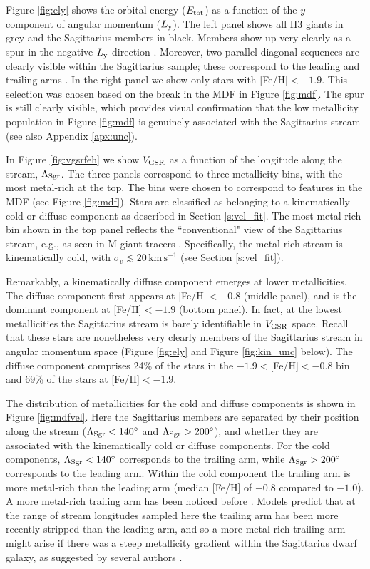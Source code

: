 \documentclass[twocolumn,tighten,twocolappendix]{aastex63}
\newcommand{\sgr}{Sagittarius}
\newcommand{\kms}{\mathrm{km} \, \mathrm{s}^{-1}}
\newcommand{\Ly}{L_{\rm y}}
\newcommand{\Vgsr}{V_{\rm GSR}}
\begin{document}
\begin{CJK*}{UTF8}{gbsn}
Figure \ref{fig:ely} shows the orbital energy ($E_{\rm tot}$) as a function of the $y-$component of angular momentum ($\Ly$).  The left panel shows all H3 giants in grey and the \sgr{} members in black.  Members show up very clearly as a spur in the negative $\Ly$ direction \citep[see also][]{Hayes20}.  Moreover, two parallel diagonal sequences are clearly visible within the \sgr{} sample; these correspond to the leading and trailing arms \citep[see also][]{Li19}.  In the right panel we show only stars with [Fe/H]$<-1.9$.  This selection was chosen based on the break in the MDF in Figure \ref{fig:mdf}.  The spur is still clearly visible, which provides visual confirmation that the low metallicity population in Figure \ref{fig:mdf} is genuinely associated with the \sgr{} stream (see also Appendix \ref{apx:unc}).

In Figure \ref{fig:vgsrfeh} we show $\Vgsr$ as a function of the longitude along the stream, $\Lambda_{\rm Sgr}$.  The three panels correspond to three metallicity bins, with the most metal-rich at the top.  The bins were chosen to correspond to features in the MDF (see Figure \ref{fig:mdf}).  Stars are classified as belonging to a kinematically cold or diffuse component as described in Section \ref{s:vel_fit}.  The most metal-rich bin shown in the top panel reflects the ``conventional" view of the \sgr{} stream, e.g., as seen in M giant tracers \cite[e.g.,][]{Belokurov14}. Specifically, the metal-rich stream is kinematically cold, with $\sigma_v\lesssim 20\,\kms$ (see Section \ref{s:vel_fit}).

Remarkably, a kinematically diffuse component emerges at lower metallicities.  The diffuse component first appears at [Fe/H]$<-0.8$ (middle panel), and is the dominant component at [Fe/H]$<-1.9$ (bottom panel).  In fact, at the lowest metallicities the \sgr{} stream is barely identifiable in $\Vgsr$ space.  Recall that these stars are nonetheless very clearly members of the \sgr{} stream in angular momentum space (Figure \ref{fig:ely} and Figure \ref{fig:kin_unc} below).  The diffuse component comprises 24\% of the stars in the $-1.9<$[Fe/H]$<-0.8$ bin and 69\% of the stars at [Fe/H]$<-1.9$.

The distribution of metallicities for the cold and diffuse components is shown in Figure \ref{fig:mdfvel}.  Here the \sgr{} members are separated by their position along the stream ($\Lambda_{\rm Sgr}<140^\circ$ and $\Lambda_{\rm Sgr}>200^\circ$), and whether they are associated with the kinematically cold or diffuse components.  For the cold components, $\Lambda_{\rm Sgr}<140^\circ$ corresponds to the trailing arm, while $\Lambda_{\rm Sgr}>200^\circ$ corresponds to the leading arm.  Within the cold component the trailing arm is more metal-rich than the leading arm (median [Fe/H] of $-0.8$ compared to $-1.0$).   A more metal-rich trailing arm has been noticed before \citep[e.g.,][]{Carlin18, Hayes20}.  Models predict that at the range of stream longitudes sampled here the trailing arm has been more recently stripped than the leading arm, and so a more metal-rich trailing arm might arise if there was a steep metallicity gradient within the \sgr{} dwarf galaxy, as suggested by several authors \citep{Chou07, LM10, Hayes20}.


\end{CJK*}
\end{document}
